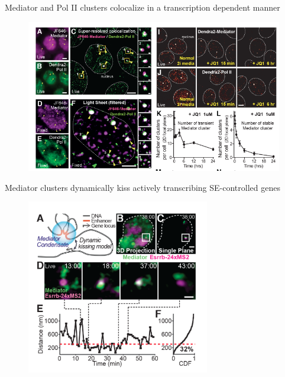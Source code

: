 \documentclass[aspectratio=1610]{beamer}					%
\begin{document}
\begin{frame}{Mediator  and  Pol  II  clusters  colocalize  in  a  transcription  dependent  manner}
\begin{figure}
\includegraphics[width=14cm]{figure-2-1.png}
\end{figure}
\end{frame}


\begin{frame}{Mediator   clusters   dynamically   kiss   actively  transcribing SE-controlled  genes}
\begin{figure}
\includegraphics[width=8cm]{figure-3-1.png}
\end{figure}
\end{frame}
\end{document}
